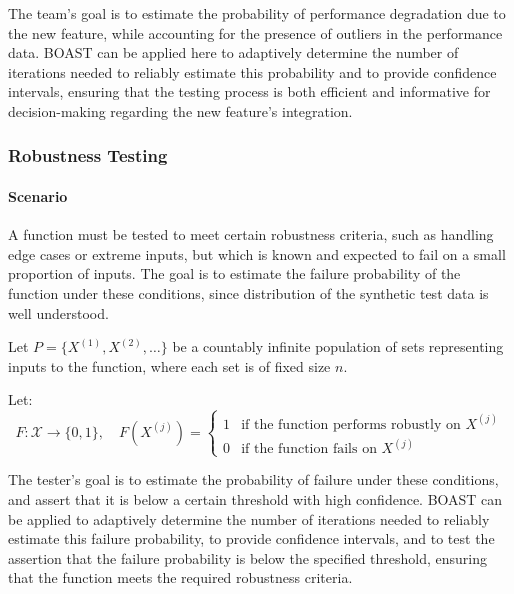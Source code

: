 The team's goal is to estimate the probability of performance degradation due to the new feature, while accounting for the presence of outliers in the performance data. BOAST can be applied here to adaptively determine the number of iterations needed to reliably estimate this probability and to provide confidence intervals, ensuring that the testing process is both efficient and informative for decision-making regarding the new feature's integration.

\subsubsection{Robustness Testing}

\paragraph{Scenario} A function must be tested to meet certain robustness criteria, such as handling edge cases or extreme inputs, but which is known and expected to fail on a small proportion of inputs. The goal is to estimate the failure probability of the function under these conditions, since distribution of the synthetic test data is well understood.

Let $P = \{ X^{(1)}, X^{(2)}, \dots \}$ be a countably infinite population of sets representing inputs to the function, where each set is of fixed size $n$.

Let:
    \[
        F : \mathcal{X} \to \{0,1\}, \quad F(X^{(j)}) =
        \begin{cases}
        1 & \text{if the function performs robustly on } X^{(j)} \\
        0 & \text{if the function fails on } X^{(j)}
        \end{cases}
    \]

The tester's goal is to estimate the probability of failure under these conditions, and assert that it is below a certain threshold with high confidence. BOAST can be applied to adaptively determine the number of iterations needed to reliably estimate this failure probability, to provide confidence intervals, and to test the assertion that the failure probability is below the specified threshold, ensuring that the function meets the required robustness criteria.